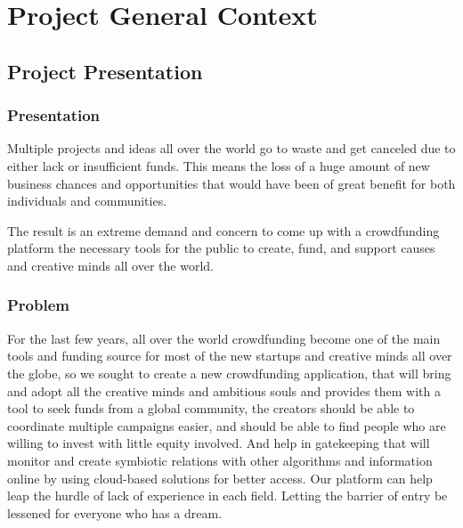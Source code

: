 

\setcounter{mtc}{8}
\chapter{Project General Context }%
\label{chap:chapter_one}
\minitoc
\section{ Project Presentation }
\subsection{Presentation}
Multiple projects and ideas all over the world go to waste and get canceled due to either lack or insufficient funds.
This means the loss of a huge amount of new business chances and opportunities that would have been of great benefit for both individuals and communities.

The result is an extreme demand and concern to come up with a crowdfunding platform the necessary tools for the public to create, fund, and support causes and creative minds all over the world.



\subsection{Problem}

For the last few years, all over the world crowdfunding become one of the main tools and funding source for most of the new startups and creative minds all over the globe,
so we sought to create a new crowdfunding application, that will bring and adopt all the creative minds and ambitious souls and provides them with a tool to seek funds from a global community,
the creators should be able to coordinate multiple campaigns easier, and should be able to find people who are willing to invest with little equity involved. And help in gatekeeping that will monitor and create symbiotic relations with other algorithms and information online by using cloud-based solutions for better access.
Our platform can help leap the hurdle of lack of experience in each field. Letting the barrier of entry be lessened for everyone who has a dream.

